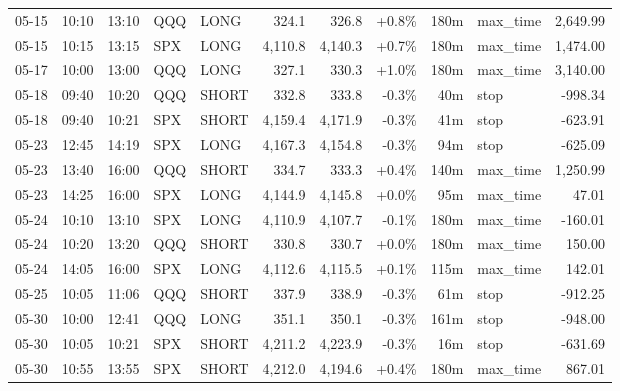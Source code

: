 \documentclass[11pt,a4paper,twoside]{article}
\begin{document}
\begin{center}
\begin{longtable}{>{\color{txtmain}}l l l l l r r r r >{\color{txtmain}}l r}
05-15 & 10:10 & 13:10 & QQQ & LONG & 324.1 & 326.8 & \textcolor{wingreen}{+0.8\%} & 180m & max\_time & \textcolor{wingreen}{2,649.99} \\
05-15 & 10:15 & 13:15 & SPX & LONG & 4,110.8 & 4,140.3 & \textcolor{wingreen}{+0.7\%} & 180m & max\_time & \textcolor{wingreen}{1,474.00} \\
05-17 & 10:00 & 13:00 & QQQ & LONG & 327.1 & 330.3 & \textcolor{wingreen}{+1.0\%} & 180m & max\_time & \textcolor{wingreen}{3,140.00} \\
05-18 & 09:40 & 10:20 & QQQ & SHORT & 332.8 & 333.8 & \textcolor{lossred}{-0.3\%} & 40m & stop & \textcolor{lossred}{-998.34} \\
05-18 & 09:40 & 10:21 & SPX & SHORT & 4,159.4 & 4,171.9 & \textcolor{lossred}{-0.3\%} & 41m & stop & \textcolor{lossred}{-623.91} \\
05-23 & 12:45 & 14:19 & SPX & LONG & 4,167.3 & 4,154.8 & \textcolor{lossred}{-0.3\%} & 94m & stop & \textcolor{lossred}{-625.09} \\
05-23 & 13:40 & 16:00 & QQQ & SHORT & 334.7 & 333.3 & \textcolor{wingreen}{+0.4\%} & 140m & max\_time & \textcolor{wingreen}{1,250.99} \\
05-23 & 14:25 & 16:00 & SPX & LONG & 4,144.9 & 4,145.8 & \textcolor{wingreen}{+0.0\%} & 95m & max\_time & \textcolor{wingreen}{47.01} \\
05-24 & 10:10 & 13:10 & SPX & LONG & 4,110.9 & 4,107.7 & \textcolor{lossred}{-0.1\%} & 180m & max\_time & \textcolor{lossred}{-160.01} \\
05-24 & 10:20 & 13:20 & QQQ & SHORT & 330.8 & 330.7 & \textcolor{wingreen}{+0.0\%} & 180m & max\_time & \textcolor{wingreen}{150.00} \\
05-24 & 14:05 & 16:00 & SPX & LONG & 4,112.6 & 4,115.5 & \textcolor{wingreen}{+0.1\%} & 115m & max\_time & \textcolor{wingreen}{142.01} \\
05-25 & 10:05 & 11:06 & QQQ & SHORT & 337.9 & 338.9 & \textcolor{lossred}{-0.3\%} & 61m & stop & \textcolor{lossred}{-912.25} \\
05-30 & 10:00 & 12:41 & QQQ & LONG & 351.1 & 350.1 & \textcolor{lossred}{-0.3\%} & 161m & stop & \textcolor{lossred}{-948.00} \\
05-30 & 10:05 & 10:21 & SPX & SHORT & 4,211.2 & 4,223.9 & \textcolor{lossred}{-0.3\%} & 16m & stop & \textcolor{lossred}{-631.69} \\
05-30 & 10:55 & 13:55 & SPX & SHORT & 4,212.0 & 4,194.6 & \textcolor{wingreen}{+0.4\%} & 180m & max\_time & \textcolor{wingreen}{867.01} \\

\end{longtable}
\end{center}
\end{document}
